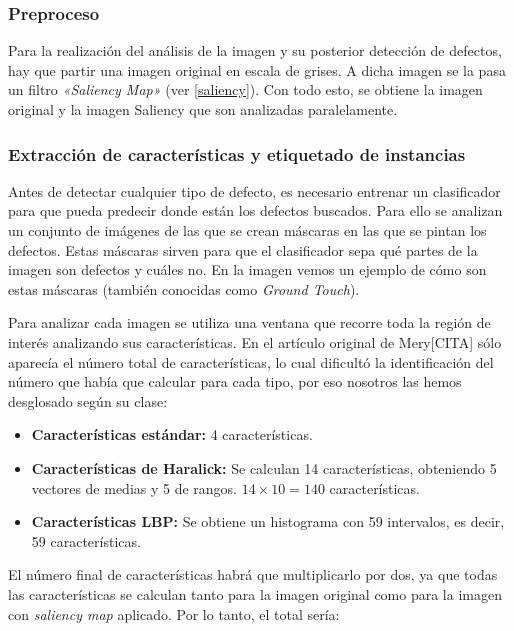 \subsubsection{Preproceso}
Para la realización del análisis de la imagen y su posterior detección de defectos, hay que partir una imagen original en escala de grises. A dicha imagen se la pasa un filtro \textit{«Saliency Map»} (ver \ref{saliency}). Con todo esto, se obtiene la imagen original y la imagen Saliency que son analizadas paralelamente.


\subsubsection{Extracción de características y etiquetado de instancias}
Antes de detectar cualquier tipo de defecto, es necesario entrenar un clasificador para que pueda predecir donde están los defectos buscados. Para ello se analizan un conjunto de imágenes de las que se crean máscaras en las que se pintan los defectos. Estas máscaras sirven para que el clasificador sepa qué partes de la imagen son defectos y cuáles no. En la imagen  vemos un ejemplo de cómo son estas máscaras (también conocidas como \textit{Ground Touch}).


Para analizar cada imagen se utiliza una ventana que recorre toda la región de interés analizando sus características. En el artículo original de Mery[CITA] sólo aparecía el número total de características, lo cual dificultó la identificación del número que había que calcular para cada tipo, por eso nosotros las hemos desglosado según su clase:

\begin{itemize}
\item \textbf{Características estándar:} 4 características.
\item \textbf{Características de Haralick:} Se calculan 14 características, obteniendo 5 vectores de medias
y 5 de rangos. $14 \times 10 = 140$ características.
\item \textbf{Características LBP:} Se obtiene un histograma con 59 intervalos, es decir, 59 características.
\end{itemize}

El número final de características habrá que multiplicarlo por dos, ya que todas las características se calculan tanto para la imagen original como para la imagen con \emph{saliency map} aplicado. Por lo tanto, el total sería:

